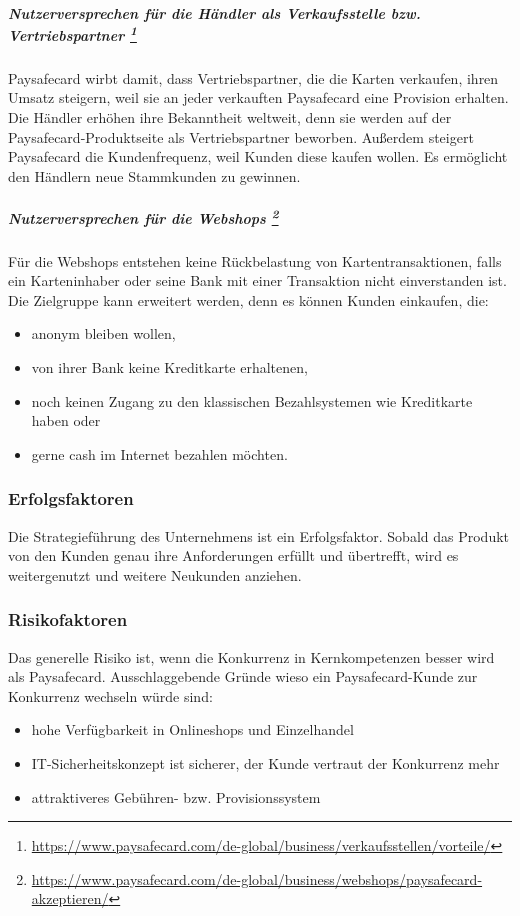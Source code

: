 \subparagraph[Nutzerversprechen für die Händler als Verkaufsstelle bzw. Vertriebspartner]{Nutzerversprechen für die Händler als Verkaufsstelle bzw. Vertriebspartner \footnote{\url{ https://www.paysafecard.com/de-global/business/verkaufsstellen/vorteile/}}}
Paysafecard wirbt damit, dass Vertriebspartner, die die Karten verkaufen, ihren Umsatz steigern, weil sie an jeder verkauften Paysafecard eine Provision erhalten. Die Händler erhöhen ihre Bekanntheit weltweit, denn sie werden auf der Paysafecard-Produktseite als Vertriebspartner beworben. Außerdem steigert Paysafecard die Kundenfrequenz, weil Kunden diese kaufen wollen. Es ermöglicht den Händlern neue Stammkunden zu gewinnen.


\subparagraph[Nutzerversprechen für die Webshops]{Nutzerversprechen für die Webshops \footnote{\url{ https://www.paysafecard.com/de-global/business/webshops/paysafecard-akzeptieren/}}}
Für die Webshops entstehen keine Rückbelastung von Kartentransaktionen, falls ein Karteninhaber oder seine Bank mit einer Transaktion nicht einverstanden ist. Die Zielgruppe kann erweitert werden, denn es können Kunden einkaufen, die: 
\begin{itemize}
	\item anonym bleiben wollen,
    \item von ihrer Bank keine Kreditkarte erhaltenen,
    \item noch keinen Zugang zu den klassischen Bezahlsystemen wie Kreditkarte haben oder
    \item gerne cash im Internet bezahlen möchten.
\end{itemize}



\subsubsection{Erfolgsfaktoren}
Die Strategieführung des Unternehmens ist ein Erfolgsfaktor. Sobald das Produkt von den Kunden genau ihre Anforderungen erfüllt und übertrefft, wird es weitergenutzt und weitere Neukunden anziehen.



\subsubsection{Risikofaktoren}
Das generelle Risiko ist, wenn die Konkurrenz in Kernkompetenzen besser wird als Paysafecard. Ausschlaggebende Gründe wieso ein Paysafecard-Kunde zur Konkurrenz wechseln würde sind:
\begin{itemize}
	\item hohe Verfügbarkeit in Onlineshops und Einzelhandel 
	\item IT-Sicherheitskonzept ist sicherer, der Kunde vertraut der Konkurrenz mehr
	\item attraktiveres Gebühren- bzw. Provisionssystem
\end{itemize}

